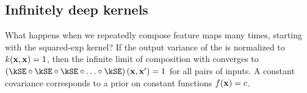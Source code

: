 \subsection{Infinitely deep kernels}
What happens when we repeatedly compose feature maps many times, starting with the squared-exp kernel?
If the output variance of the \kSE{} is normalized to ${k({\bf{x}},{\bf{x}}) = 1}$, then the infinite limit of composition with \kSE{} converges to ${\left(\kSE \circ \kSE \circ \kSE \circ \ldots \circ \kSE\right)(\vx,\vx') = 1}$ for all pairs of inputs.
A constant covariance corresponds to a prior on constant functions ${f({\bf{x}}) = c}$.

%


